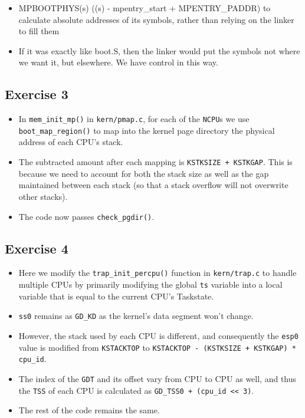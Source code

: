 \documentclass[]{article}
\begin{document}
\begin{itemize}
\itemsep1pt\parskip0pt
\item
  MPBOOTPHYS(s) ((s) - mpentry\_start + MPENTRY\_PADDR) to calculate
  absolute addresses of its symbols, rather than relying on the linker
  to fill them
\item
  If it was exactly like boot.S, then the linker would put the symbols
  not where we want it, but elsewhere. We have control in this way.
\end{itemize}

\subsection{Exercise 3}

\begin{itemize}
\itemsep1pt\parskip0pt
\item
  In \texttt{mem\_init\_mp()} in \texttt{kern/pmap.c}, for each of the
  \texttt{NCPU}s we use \texttt{boot\_map\_region()} to map into the
  kernel page directory the physical address of each CPU's stack.
\item
  The subtracted amount after each mapping is
  \texttt{KSTKSIZE + KSTKGAP}. This is because we need to account for
  both the stack size as well as the gap maintained between each stack
  (so that a stack overflow will not overwrite other stacks).
\item
  The code now passes \texttt{check\_pgdir()}.
\end{itemize}

\subsection{Exercise 4}

\begin{itemize}
\itemsep1pt\parskip0pt
\item
  Here we modify the \texttt{trap\_init\_percpu()} function in
  \texttt{kern/trap.c} to handle multiple CPUs by primarily modifying
  the global \texttt{ts} variable into a local variable that is equal to
  the current CPU's Taskstate.
\item
  \texttt{ss0} remains as \texttt{GD\_KD} as the kernel's data segment
  won't change.
\item
  However, the stack used by each CPU is different, and consequently the
  \texttt{esp0} value is modified from \texttt{KSTACKTOP} to
  \texttt{KSTACKTOP - (KSTKSIZE + KSTKGAP) * cpu\_id}.
\item
  The index of the \texttt{GDT} and its offset vary from CPU to CPU as
  well, and thus the \texttt{TSS} of each CPU is calculated as
  \texttt{GD\_TSS0 + (cpu\_id \textless{}\textless{} 3)}.
\item
  The rest of the code remains the same.
\end{itemize}
\end{document}
